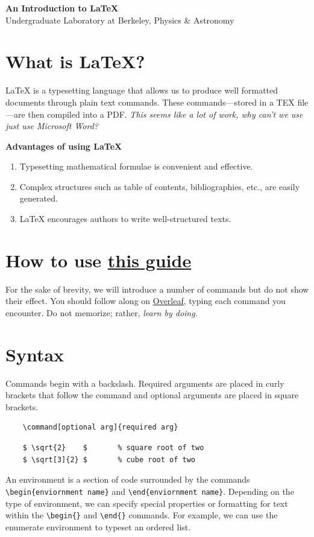 \documentclass[11pt]{article}
\begin{document}
\begin{center}
    \huge \textbf{An Introduction to \LaTeX}\\{\LARGE Undergraduate Laboratory at Berkeley, Physics \& Astronomy}
\end{center}

\section{What is LaTeX?}

LaTeX is a typesetting language that allows us to produce well formatted documents through plain text commands. These commands---stored in a TEX file---are then compiled into a PDF. \textit{This seems like a lot of work, why can't we use just use Microsoft Word?}

\textbf{Advantages of using LaTeX}
\begin{enumerate}
    \item Typesetting mathematical formulae is convenient and effective.
    \item Complex structures such as table of contents, bibliographies, etc., are easily generated.
    \item LaTeX encourages authors to write well-structured texts.
\end{enumerate}

\section{How to use \href{https://www.overleaf.com/read/bdvjgzpbvchk
}{this guide}}

For the sake of brevity, we will introduce a number of commands but do not show their effect. You should follow along on \hyperref[overleaf]{Overleaf}, typing each command you encounter. Do not memorize; rather, \textit{learn by doing.} 

\section{Syntax}

Commands begin with a backslash. Required arguments are placed in curly brackets that follow the command and optional arguments are placed in square brackets.

{\color{blue}
\begin{verbatim}
    \command[optional arg]{required arg}
\end{verbatim}}
{\color{blue}
\begin{verbatim}
    $ \sqrt{2}    $       % square root of two
    $ \sqrt[3]{2} $       % cube root of two
\end{verbatim}}
An environment is a section of code surrounded by the commands {\color{blue}\verb|\begin{enviornment name}|} and {\color{blue}\verb|\end{enviornment name}|}. Depending on the type of environment, we can specify special properties or formatting for text within the {\color{blue}\verb|\begin{}|} and {\color{blue}\verb|\end{}|} commands. For example, we can use the enumerate environment to typeset an ordered list. 
\end{document}

